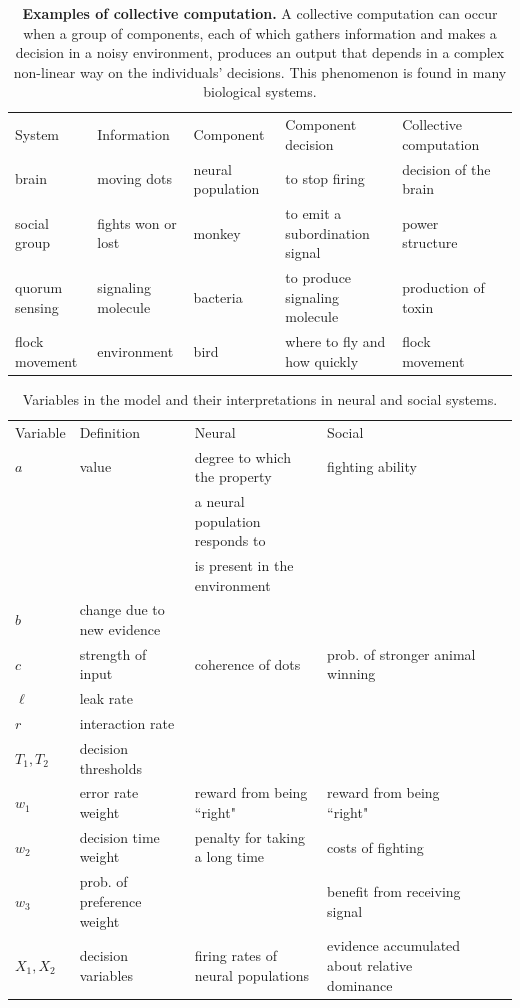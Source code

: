 \documentclass{pnastwo}
\begin{document}
\begin{table}[h]
\caption{\label{examples}{\bf  Examples of collective computation.} A collective computation can occur when a group of components, each of which gathers information and makes a decision in a noisy environment, produces an output that depends in a complex non-linear way on the individuals' decisions. This phenomenon is found in many biological systems. }
\begin{tabular}{@{\vrule height 10.5pt depth4pt  width0pt}llllll@{}}
System & Information & Component &   Component decision & Collective computation \\
\cline{1-5} 
brain & moving dots& neural population & to stop firing & decision of the brain
\\  social group & fights won or lost & monkey & to emit a subordination signal & power structure
\\  quorum sensing & signaling molecule & bacteria & to produce signaling molecule & production of toxin
\\ flock movement & environment & bird & where to fly and how quickly & flock movement
\\
\hline
\end{tabular}
\end{table}


\begin{table}[ht]
\caption{\label{variables}{ Variables in the model and their interpretations in neural and social systems.} }
\begin{tabular}{@{\vrule height 10.5pt depth4pt  width0pt}llllll@{}}
Variable & Definition & Neural &   Social \\
\cline{1-4} 
$a$  & value &  degree to which the property  & fighting ability
\\ & & a neural population responds to 
\\ & & is present in the environment&
\\ $b$ & change due to new evidence
\\$c$ & strength of input & coherence of dots & prob. of stronger animal winning
\\ $\ell$ & leak rate
\\ $r$ & interaction rate 
\\ $T_1,T_2$ & decision thresholds
\\ $w_1$ & error rate weight & reward from being ``right" & reward from being ``right"
\\ $w_2$ & decision time weight & penalty for taking a long time & costs of fighting
\\ $w_3$ & prob. of preference weight &  & benefit from receiving signal
\\$X_1,X_2$ & decision variables &  firing rates of neural populations & evidence accumulated about relative dominance
\\
\hline
\end{tabular}
\end{table}
\end{document}
